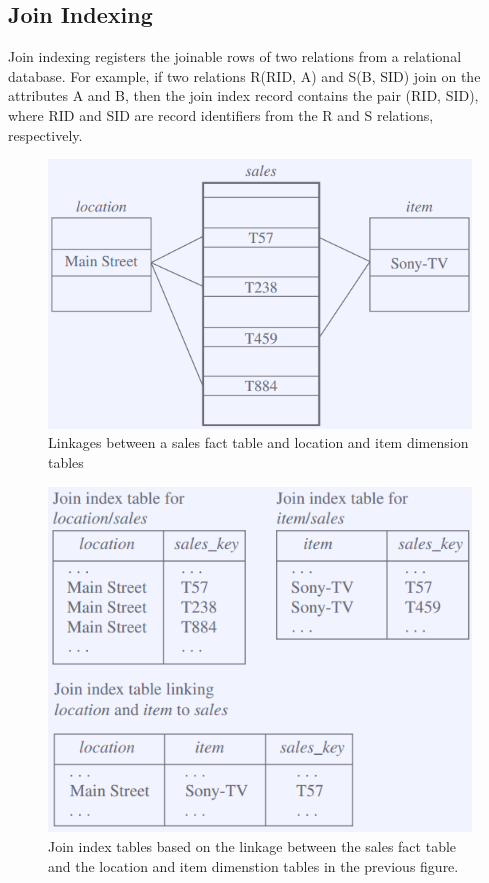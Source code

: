 		\clearpage
		\subsection*{Join Indexing}

			Join indexing registers the joinable rows of two relations from a 
			relational database.  For example, if two relations R(RID, A) and S(B, SID) join
			on the attributes A and B, then the join index record contains the pair
			(RID, SID), where RID and SID are record identifiers from the R and S relations, 
			respectively. 

			\begin{figure}[H]
				\centering
				\includegraphics[scale=0.5]{pics/join1.png}
				\caption{Linkages between a sales fact table and location and item dimension tables}
			\end{figure} 

			\begin{figure}[H]
				\centering
				\includegraphics[scale=0.5]{pics/join2.png}
				\caption{Join index tables based on the linkage between the sales fact table and 
				the location and item dimenstion tables in the previous figure.}
			\end{figure} 

